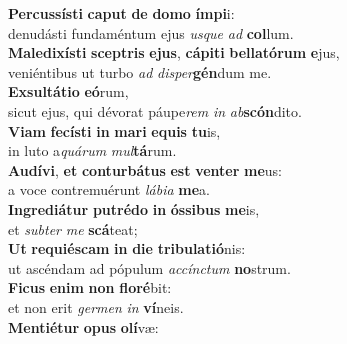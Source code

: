 \evenverse \textbf{Per}\textbf{cus}\textbf{sí}\textbf{sti} \textbf{ca}\textbf{put} \textbf{de} \textbf{do}\textbf{mo} \textbf{ím}\textbf{pi}i:~\*\\
\evenverse denudásti fundaméntum ejus \textit{us}\textit{que} \textit{ad} \textbf{col}lum.\\
\oddverse \textbf{Ma}\textbf{le}\textbf{di}\textbf{xí}\textbf{sti} \textbf{scep}\textbf{tris} \textbf{e}\textbf{jus}, \textbf{cá}\textbf{pi}\textbf{ti} \textbf{bel}\textbf{la}\textbf{tó}\textbf{rum} \textbf{e}jus,~\*\\
\oddverse veniéntibus ut turbo \textit{ad} \textit{di}\textit{sper}\textbf{gén}dum me.\\
\evenverse \textbf{Ex}\textbf{sul}\textbf{tá}\textbf{ti}\textbf{o} \textbf{e}\textbf{ó}rum,~\*\\
\evenverse sicut ejus, qui dévorat páupe\textit{rem} \textit{in} \textit{ab}\textbf{scón}dito.\\
\oddverse \textbf{Vi}\textbf{am} \textbf{fe}\textbf{cí}\textbf{sti} \textbf{in} \textbf{ma}\textbf{ri} \textbf{e}\textbf{quis} \textbf{tu}is,~\*\\
\oddverse in luto a\textit{quá}\textit{rum} \textit{mul}\textbf{tá}rum.\\
\evenverse \textbf{Au}\textbf{dí}\textbf{vi}, \textbf{et} \textbf{con}\textbf{tur}\textbf{bá}\textbf{tus} \textbf{est} \textbf{ven}\textbf{ter} \textbf{me}us:~\*\\
\evenverse a voce contremuérunt \textit{lá}\textit{bi}\textit{a} \textbf{me}a.\\
\oddverse \textbf{In}\textbf{gre}\textbf{di}\textbf{á}\textbf{tur} \textbf{pu}\textbf{tré}\textbf{do} \textbf{in} \textbf{ós}\textbf{si}\textbf{bus} \textbf{me}is,~\*\\
\oddverse et \textit{sub}\textit{ter} \textit{me} \textbf{scá}teat;\\
\evenverse \textbf{Ut} \textbf{re}\textbf{qui}\textbf{é}\textbf{scam} \textbf{in} \textbf{di}\textbf{e} \textbf{tri}\textbf{bu}\textbf{la}\textbf{ti}\textbf{ó}nis:~\*\\
\evenverse ut ascéndam ad pópulum \textit{ac}\textit{cín}\textit{ctum} \textbf{no}strum.\\
\oddverse \textbf{Fi}\textbf{cus} \textbf{e}\textbf{nim} \textbf{non} \textbf{flo}\textbf{ré}bit:~\*\\
\oddverse et non erit \textit{ger}\textit{men} \textit{in} \textbf{ví}neis.\\
\evenverse \textbf{Men}\textbf{ti}\textbf{é}\textbf{tur} \textbf{o}\textbf{pus} \textbf{o}\textbf{lí}væ:~\*\\

